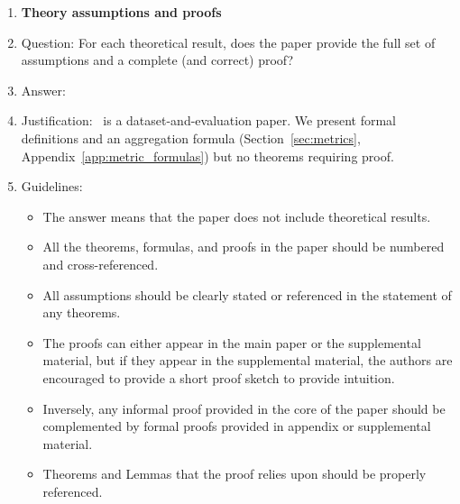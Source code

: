 \begin{enumerate}
\begin{itemize}
        \item The authors should discuss the computational efficiency of the proposed algorithms and how they scale with dataset size.
        \item If applicable, the authors should discuss possible limitations of their approach to address problems of privacy and fairness.
        \item While the authors might fear that complete honesty about limitations might be used by reviewers as grounds for rejection, a worse outcome might be that reviewers discover limitations that aren't acknowledged in the paper. The authors should use their best judgment and recognize that individual actions in favor of transparency play an important role in developing norms that preserve the integrity of the community. Reviewers will be specifically instructed to not penalize honesty concerning limitations.
    \end{itemize}

\item {\bf Theory assumptions and proofs}
    \item[] Question: For each theoretical result, does the paper provide the full set of assumptions and a complete (and correct) proof?
    \item[] Answer: \answerNA{}
    \item[] Justification: \medvigil\ is a dataset-and-evaluation paper. We present formal definitions and an aggregation formula (Section~\ref{sec:metrics}, Appendix~\ref{app:metric_formulas}) but no theorems requiring proof.
    \item[] Guidelines:
    \begin{itemize}
        \item The answer \answerNA{} means that the paper does not include theoretical results.
        \item All the theorems, formulas, and proofs in the paper should be numbered and cross-referenced.
        \item All assumptions should be clearly stated or referenced in the statement of any theorems.
        \item The proofs can either appear in the main paper or the supplemental material, but if they appear in the supplemental material, the authors are encouraged to provide a short proof sketch to provide intuition.
        \item Inversely, any informal proof provided in the core of the paper should be complemented by formal proofs provided in appendix or supplemental material.
        \item Theorems and Lemmas that the proof relies upon should be properly referenced.
    \end{itemize}


\end{enumerate}
